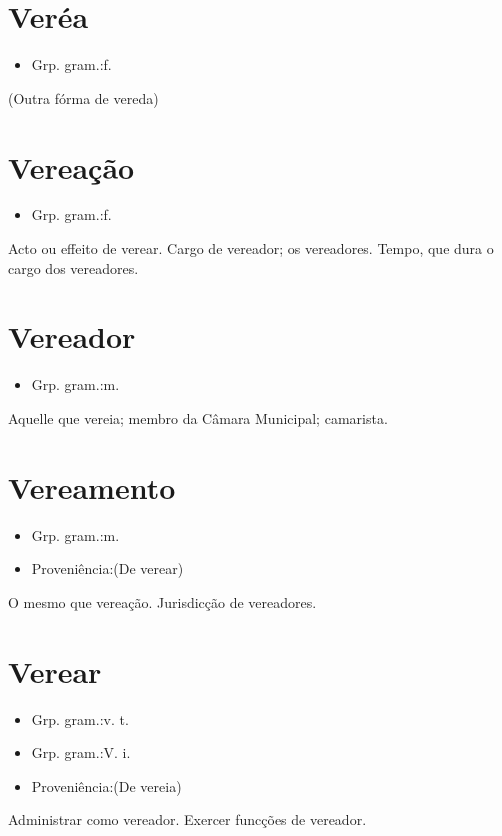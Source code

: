 \documentclass{article}
\begin{document}
\section{Veréa}
\begin{itemize}
\item {Grp. gram.:f.}
\end{itemize}
(Outra fórma de \textunderscore vereda\textunderscore )
\section{Vereação}
\begin{itemize}
\item {Grp. gram.:f.}
\end{itemize}
Acto ou effeito de verear.
Cargo de vereador; os vereadores.
Tempo, que dura o cargo dos vereadores.
\section{Vereador}
\begin{itemize}
\item {Grp. gram.:m.}
\end{itemize}
Aquelle que vereia; membro da Câmara Municipal; camarista.
\section{Vereamento}
\begin{itemize}
\item {Grp. gram.:m.}
\end{itemize}
\begin{itemize}
\item {Proveniência:(De \textunderscore verear\textunderscore )}
\end{itemize}
O mesmo que \textunderscore vereação\textunderscore .
Jurisdicção de vereadores.
\section{Verear}
\begin{itemize}
\item {Grp. gram.:v. t.}
\end{itemize}
\begin{itemize}
\item {Grp. gram.:V. i.}
\end{itemize}
\begin{itemize}
\item {Proveniência:(De \textunderscore vereia\textunderscore )}
\end{itemize}
Administrar como vereador.
Exercer funcções de vereador.
\end{document}
